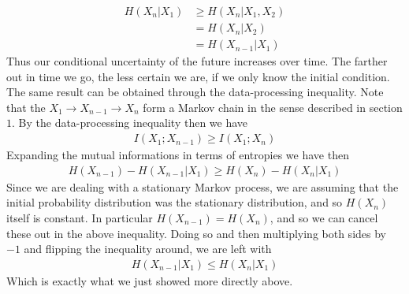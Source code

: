 \documentclass{article}
\theoremstyle{definition}
\theoremstyle{plain}
\begin{document}
\begin{align}
	H(X_n|X_1) &\geq H(X_n|X_1,X_2) \\
				&= H(X_n|X_2) \\
				&= H(X_{n-1}|X_1)
\end{align}
Thus our conditional uncertainty of the future increases over time. The farther out in time we go, the less certain we are, if we only know the initial condition. The same result can be obtained through the data-processing inequality. Note that the $X_1 \to X_{n-1} \to X_n$ form a Markov chain in the sense described in section $1$. By the data-processing inequality then we have 
\begin{align}
	I(X_1;X_{n-1}) \geq I(X_1;X_n)
\end{align}
Expanding the mutual informations in terms of entropies we have then
\begin{align}
	H(X_{n-1}) - H(X_{n-1}|X_1) \geq H(X_n) - H(X_n|X_1)
\end{align}
Since we are dealing with a stationary Markov process, we are assuming that the initial probability distribution was the stationary distribution, and so $H(X_n)$ itself is constant. In particular $H(X_{n-1}) = H(X_n)$, and so we can cancel these out in the above inequality. Doing so and then multiplying both sides by $-1$ and flipping the inequality around, we are left with
\begin{align}
	H(X_{n-1}|X_1) \leq H(X_n|X_1)
\end{align} 
Which is exactly what we just showed more directly above. 
\end{document}
